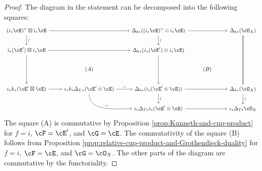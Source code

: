 \documentclass[12pt]{amsart}
\numberwithin{equation}{section}
\theoremstyle{plain}
\theoremstyle{definition}
\begin{document}
\begin{proof}
    The diagram in the statement can be decomposed into the following squares:
    \[
        \begin{tikzcd}
            (i_*{\cE})^\vee \boxtimes i_*{\cE} \ar[rr]\ar[d, "\sim", sloped] &  & \Delta_{k*}((i_*{\cE})^\vee \otimes i_*{\cE}) \ar[rr]\ar[d, "\sim", sloped] &  & \Delta_{k*}(\cO_X) \ar[ddd, equal]\\
            i_*(\cE')\boxtimes i_*{\cE} \ar[rr]\ar[dd]&  & \Delta_{k*}(i_*(\cE')\otimes i_*{\cE}) \ar[dd] &  & \\
            & (A) &  & (B) & \\
            \iota_*k_*(\cE' \boxtimes \cE) \ar[r] & \iota_*k_*\Delta_{Y*}(\cE' \otimes \cE) \ar[r, "\sim"]\ar[rd, out=-90, in=180, "\sim"] & \Delta_{k*}(i_*(\cE' \otimes \cE)) \ar[rr]\ar[d, "\sim", sloped] &  & \Delta_{k*}(\cO_X) \ar[d, "\sim", sloped] \\
            &  & \iota_*\Delta_{T*}i_*(\cE' \otimes \cE) \ar[rr] &  & \iota_*\Delta_{T*}\cO_X
        \end{tikzcd}
    \]
    The square (A) is commutative by Proposition \ref{prop:Kunneth-and-cup-product} for $f = i$, $\cF = \cE'$, and $\cG = \cE$.
    The commutativity of the square (B) follows from Proposition \ref{prop:relative-cup-product-and-Grothendieck-duality} for $f = i$, $\cF = \cE$, and $\cG = \cO_X$.
    The other parts of the diagram are commutative by the functoriality.
\end{proof}
\end{document}
